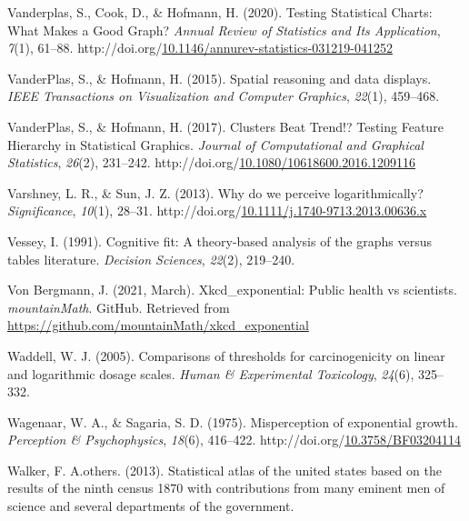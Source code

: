 \documentclass[print]{nuthesis}
\newlength{\cslhangindent}
\newenvironment{CSLReferences}%
{\setlength{\parindent}{0pt}%
\everypar{\setlength{\hangindent}{\cslhangindent}}\ignorespaces}%
{\par}
\begin{document}
\begin{CSLReferences}{1}{0}
\leavevmode{}%
Vanderplas, S., Cook, D., \& Hofmann, H. (2020). Testing {Statistical} {Charts}: {What} {Makes} a {Good} {Graph}? \emph{Annual Review of Statistics and Its Application}, \emph{7}(1), 61--88. http://doi.org/\href{https://doi.org/10.1146/annurev-statistics-031219-041252}{10.1146/annurev-statistics-031219-041252}

\leavevmode{}%
VanderPlas, S., \& Hofmann, H. (2015). Spatial reasoning and data displays. \emph{IEEE Transactions on Visualization and Computer Graphics}, \emph{22}(1), 459--468.

\leavevmode{}%
VanderPlas, S., \& Hofmann, H. (2017). Clusters {Beat} {Trend}!? {Testing} {Feature} {Hierarchy} in {Statistical} {Graphics}. \emph{Journal of Computational and Graphical Statistics}, \emph{26}(2), 231--242. http://doi.org/\href{https://doi.org/10.1080/10618600.2016.1209116}{10.1080/10618600.2016.1209116}

\leavevmode{}%
Varshney, L. R., \& Sun, J. Z. (2013). Why do we perceive logarithmically? \emph{Significance}, \emph{10}(1), 28--31. http://doi.org/\href{https://doi.org/10.1111/j.1740-9713.2013.00636.x}{10.1111/j.1740-9713.2013.00636.x}

\leavevmode{}%
Vessey, I. (1991). Cognitive fit: A theory-based analysis of the graphs versus tables literature. \emph{Decision Sciences}, \emph{22}(2), 219--240.

\leavevmode{}%
Von Bergmann, J. (2021, March). Xkcd\_exponential: Public health vs scientists. \emph{mountainMath}. GitHub. Retrieved from \url{https://github.com/mountainMath/xkcd_exponential}

\leavevmode{}%
Waddell, W. J. (2005). Comparisons of thresholds for carcinogenicity on linear and logarithmic dosage scales. \emph{Human \& Experimental Toxicology}, \emph{24}(6), 325--332.

\leavevmode{}%
Wagenaar, W. A., \& Sagaria, S. D. (1975). Misperception of exponential growth. \emph{Perception \& Psychophysics}, \emph{18}(6), 416--422. http://doi.org/\href{https://doi.org/10.3758/BF03204114}{10.3758/BF03204114}

\leavevmode{}%
Walker, F. A.others. (2013). Statistical atlas of the united states based on the results of the ninth census 1870 with contributions from many eminent men of science and several departments of the government.


\end{CSLReferences}
\end{document}
